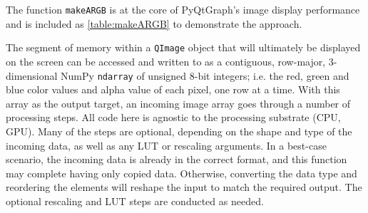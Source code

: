 \documentclass[journal]{vgtc}                %
\begin{document}
The function \texttt{makeARGB} is at the core of PyQtGraph's image display performance and is included as \autoref{table:makeARGB} to demonstrate the approach.

The segment of memory within a \texttt{QImage} object that will ultimately be displayed on the screen can be accessed and written to as a contiguous, row-major, 3-dimensional NumPy \texttt{ndarray} of unsigned 8-bit integers; i.e. the red, green and blue color values and alpha value of each pixel, one row at a time. With this array as the output target, an incoming image array goes through a number of processing steps. All code here is agnostic to the processing substrate (CPU, GPU). Many of the steps are optional, depending on the shape and type of the incoming data, as well as any LUT or rescaling arguments. In a best-case scenario, the incoming data is already in the correct format, and this function may complete having only copied data. Otherwise, converting the data type and reordering the elements will reshape the input to match the required output. The optional rescaling and LUT steps are conducted as needed.


\FloatBarrier

%

%
%
%


\end{document}
